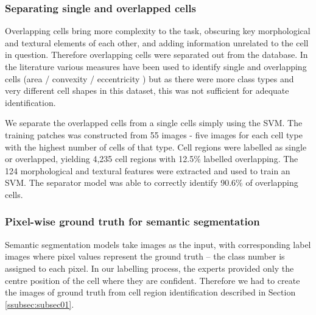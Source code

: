 \documentclass[final,5p,times,twocolumn,authoryear]{elsarticle}
\begin{document}

\subsubsection{Separating single and overlapped cells}
\label{subsubsec:sec2}

Overlapping cells bring more complexity to the task, obscuring key morphological and textural elements of each other, and adding information unrelated to the cell in question. Therefore overlapping cells were separated out from the database. In the literature various measures have been used to identify single and overlapping cells (area / convexity / eccentricity \citep{Wei2015AImaging,Abu-Qasmieh2018NovelCells}) but as there were more class types and very different cell shapes in this dataset, this was not sufficient for adequate identification.

We separate the overlapped cells from a single cells simply using the SVM. The training patches was constructed from 55 images - five images for each cell type with the highest number of cells of that type. Cell regions were labelled as single or overlapped, yielding 4,235 cell regions with 12.5\% labelled overlapping. The 124 morphological and textural features were extracted and used to train an SVM. The separator model was able to correctly identify 90.6\% of overlapping cells.


\subsubsection{Pixel-wise ground truth for semantic segmentation}
\label{subsec:groundtruth}

Semantic segmentation models take images as the input, with corresponding label images where pixel values represent the ground truth -- the class number is assigned to each pixel. In our labelling process, the experts provided only the centre position of the cell where they are confident. Therefore we had to create the images of ground truth from cell region identification described in Section \ref{ssubsec:subsec01}.
\end{document}
